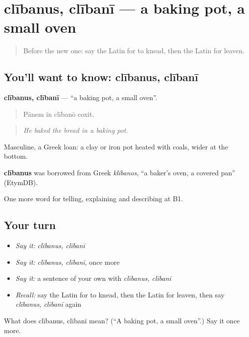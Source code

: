 \section[clībanus, clībanī]{clībanus, clībanī — a baking pot, a small oven}

\label{lesson:LA-C352-clibanus}



\begin{quote}
Before the new one: say the Latin for to knead, then the Latin for leaven.
\end{quote}

\subsection*{You'll want to know: clībanus, clībanī}
\textbf{clībanus, clībanī} — \textquotedblleft{}a baking pot, a small oven\textquotedblright{}.

\begin{quote}
Pānem in clībanō coxit.
\end{quote}

\begin{quote}
\emph{He baked the bread in a baking pot.}
\end{quote}

Masculine, a Greek loan: a clay or iron pot heated with coals, wider at the bottom.

\begin{cousinweb}
\textbf{clībanus} was borrowed from Greek \emph{klibanos}, \textquotedblleft{}a baker's oven, a covered pan\textquotedblright{} (EtymDB).
\end{cousinweb}

\begin{grammarlens}[title={What you've built}]
One more word for telling, explaining and describing at B1.
\end{grammarlens}

\subsection*{Your turn}
\begin{itemize}
\raggedright
  \item \emph{Say it:} \emph{clībanus, clībanī}
  \item \emph{Say it:} \emph{clībanus, clībanī}, once more
  \item \emph{Say it:} a sentence of your own with \emph{clībanus, clībanī}
  \item \emph{Recall:} say the Latin for to knead, then the Latin for leaven, then say \emph{clībanus, clībanī} again
\end{itemize}

\begin{tcolorbox}[breakable,colback=teal!4,colframe=teal!35!black,title={Before you move on}]
What does clībanus, clībanī mean? (\textquotedblleft{}A baking pot, a small oven\textquotedblright{}.) Say it once more.
\end{tcolorbox}
